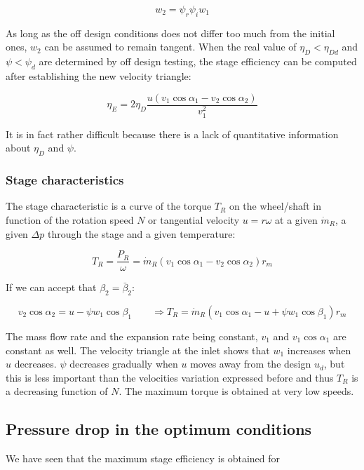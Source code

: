 \begin{equation}
w_2 = \psi _r \psi _i w_1
\end{equation}

As long as the off design conditions does not differ too much from the initial ones, $w_2$ can be assumed to remain tangent. When the real value of $\eta _D < \eta _{Dd}$ and $\psi < \psi _d$ are determined by off design testing, the stage efficiency can be computed after establishing the new velocity triangle: 

\begin{equation}
\eta _E = 2\eta _D \frac{u(v_1\cos \alpha _1 - v_2\cos \alpha _2)}{v_1^2}
\end{equation}

It is in fact rather difficult because there is a lack of quantitative information about $\eta _D$ and $\psi$. 

\subsubsection{Stage characteristics}
The stage characteristic is a curve of the torque $T_R$ on the wheel/shaft in function of the rotation speed $N$ or tangential velocity $u = r\omega$ at a given $\dot{m}_R$, a given $\Delta p$ through the stage and a given temperature: 

\begin{equation}
T_R = \frac{P_R}{\omega} = \dot{m}_R (v_1 \cos \alpha _1 - v_2 \cos \alpha _2) r_m 
\end{equation}

If we can accept that $\beta _2 = \bar{\beta}_2$: 

\begin{equation}
v_2\cos \alpha _2 = u-  \psi w_1\cos \beta _1 \qquad \Rightarrow T_R = \dot{m}_R (v_1 \cos \alpha _1 - u + \psi w_1\cos \beta _1  ) r_m 
\end{equation}

The mass flow rate and the expansion rate being constant, $v_1$ and $v_1 \cos \alpha _1$ are constant as well. The velocity triangle at the inlet shows that $w_1$ increases when $u$ decreases. $\psi$ decreases gradually when $u$ moves away from the design $u_d$, but this is less important than the velocities variation expressed before and thus $T_R$ is a decreasing function of $N$. The maximum torque is obtained at very low speeds.

\subsection{Pressure drop in the optimum conditions}
We have seen that the maximum stage efficiency is obtained for 

